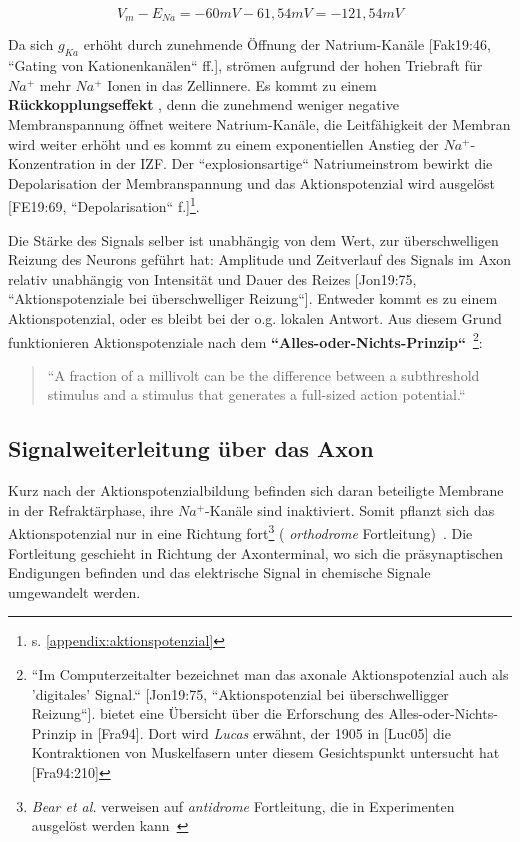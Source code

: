 {{ \begin{equation}
  V_m - E_{Na} = -60 mV - 61,54 mV = -121,54 mV
  \label{eq:gl-triebkraft}
 \end{equation}


Da sich $g_{Ka}$ erhöht durch zunehmende Öffnung der Natrium-Kanäle  [Fak19:46, ``Gating von Kationenkanälen`` ff.], strömen aufgrund der hohen Triebraft für $Na^+$ mehr $Na^+$ Ionen in das Zellinnere. Es kommt zu einem \textbf{Rückkopplungseffekt} , denn die zunehmend weniger negative Membranspannung öffnet weitere Natrium-Kanäle, die Leitfähigkeit der Membran wird weiter erhöht und es kommt zu einem exponentiellen Anstieg der $Na^+$-Konzentration in der IZF. Der ``explosionsartige`` Natriumeinstrom bewirkt die Depolarisation der Membranspannung und das Aktionspotenzial wird ausgelöst [FE19:69, ``Depolarisation`` f.]\footnote{
s. \ref{appendix:aktionspotenzial}
}.

Die Stärke des Signals selber ist unabhängig von dem Wert, zur überschwelligen Reizung des Neurons geführt hat: Amplitude und Zeitverlauf des Signals im Axon relativ unabhängig von Intensität und Dauer des Reizes [Jon19:75, ``Aktionspotenziale bei überschwelliger Reizung``]. Entweder kommt es zu einem Aktionspotenzial, oder es bleibt bei der o.g. lokalen Antwort. Aus diesem Grund funktionieren Aktionspotenziale nach dem \textbf{``Alles-oder-Nichts-Prinzip``}~\cite[89]{BCP18}\footnote{
 ``Im Computerzeitalter bezeichnet man das axonale Aktionspotenzial auch als 'digitales' Signal.`` {[Jon19:75, ``Aktionspotenzial bei überschwelligger Reizung``]}.  bietet eine Übersicht über die Erforschung des Alles-oder-Nichts-Prinzip in [Fra94]. Dort wird \textit{Lucas} erwähnt, der 1905 in {[Luc05]} die Kontraktionen von Muskelfasern unter diesem Gesichtspunkt untersucht hat {[Fra94:210]}
}:

\blockquote[{\cite[157]{KSJ+13}}]{
 ``A fraction of a millivolt can be the difference between a subthreshold stimulus and a stimulus that generates a full-sized action potential.``
}

\subsection{Signalweiterleitung über das Axon}

Kurz nach der Aktionspotenzialbildung befinden sich daran beteiligte Membrane in der Refraktärphase, ihre $Na^+$-Kanäle sind inaktiviert. 
Somit pflanzt sich das Aktionspotenzial nur in eine Richtung fort\footnote{
  \textit{Bear et al.} verweisen auf \textit{antidrome} Fortleitung, die in Experimenten ausgelöst werden kann~\cite[106]{BCP18}
} ( \textit{orthodrome} Fortleitung)~\cite[106]{BCP18}.
Die Fortleitung geschieht in Richtung der Axonterminal, wo sich die präsynaptischen Endigungen befinden und das elektrische Signal in chemische Signale umgewandelt werden.

}}
